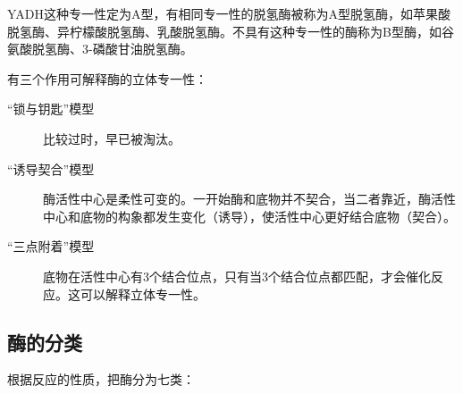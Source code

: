 YADH这种专一性定为A型，有相同专一性的脱氢酶被称为A型脱氢酶，如苹果酸脱氢酶、异柠檬酸脱氢酶、乳酸脱氢酶。不具有这种专一性的酶称为B型酶，如谷氨酸脱氢酶、3-磷酸甘油脱氢酶。

有三个作用可解释酶的立体专一性：
\begin{description}
	\item[“锁与钥匙”模型] 比较过时，早已被淘汰。
	\item[“诱导契合”模型] 酶活性中心是柔性可变的。一开始酶和底物并不契合，当二者靠近，酶活性中心和底物的构象都发生变化（诱导），使活性中心更好结合底物（契合）。
	\item[“三点附着”模型] 底物在活性中心有3个结合位点，只有当3个结合位点都匹配，才会催化反应。这可以解释立体专一性。
\end{description}

\subsection{酶的分类}

根据反应的性质，把酶分为七类：

